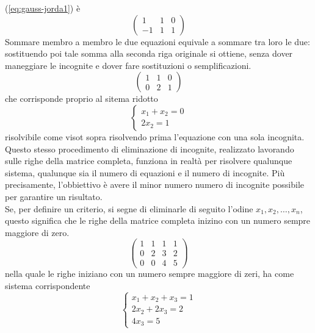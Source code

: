 (\ref{eq:gauss-jorda1}) è
\begin{equation}
  \label{eq:gauss-jorda2}
  \begin{pmatrix}
    1 & 1 & 0\\
    -1 & 1 & 1
  \end{pmatrix}
\end{equation}
Sommare membro a membro le due equazioni equivale a sommare tra loro le
due: sostituendo poi tale somma alla seconda riga originale si ottiene,
senza dover maneggiare le incognite e dover fare sostituzioni o
semplificazioni.
\begin{equation}
  \label{eq:gauss-jorda3}
  \begin{pmatrix}
    1 & 1 & 0\\
    0 & 2 & 1
  \end{pmatrix}
\end{equation}
che corrisponde proprio al sitema ridotto
\begin{equation*}
  \begin{cases}
    x_1+x_2=0\\
    2x_2=1
  \end{cases}
\end{equation*}
risolvibile come visot sopra risolvendo prima l'equazione con una sola
incognita.\\
Questo stesso procedimento di eliminazione di incognite, realizzato
lavorando sulle righe della matrice completa, funziona in realtà per
risolvere qualunque sistema, qualunque sia il numero di equazioni e il
numero di incognite. Più precisamente, l'obbiettivo è avere il minor
numero numero di incognite possibile per garantire un risultato.\\
Se, per definire un criterio, si segne di eliminarle di seguito l'odine
$x_1,x_2,\dots, x_n$, questo significa che le righe della matrice completa
inizino con un numero sempre maggiore di zero.
\begin{equation*}
  \begin{pmatrix}
    1 & 1 & 1 & 1\\
    0 & 2 & 3 & 2\\
    0 & 0 & 4 & 5
  \end{pmatrix}
\end{equation*}
nella quale le righe iniziano con un numero sempre maggiore di zeri, ha
come sistema corrispondente
\begin{equation*}
  \begin{cases}
    x_1+x_2+x_3=1\\
    2x_2+2x_3=2\\
    4x_3=5
  \end{cases}
\end{equation*}
